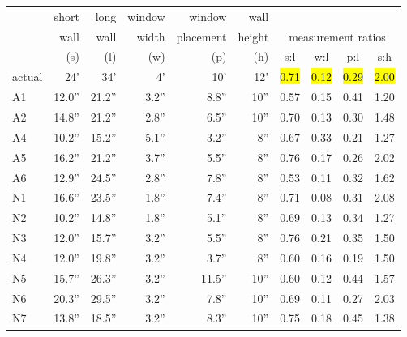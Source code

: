 \documentclass[review]{vgtc}                 %
\begin{document}
\begin{table}[b]
\vspace{-0.1in}
\begin{center}
\begin{small}
\begin{tabular}{@{}l@{~~}|@{~~}r@{~~~}r@{~~~}r@{~~~}r@{~~~}r@{~~}|@{~~}c@{~~~}c@{~~~}c@{~~~}c@{}} 
~       &  short   & long     & window  & window  &  wall      &  & & & \\
~       &  wall    & wall     & width   & placement &  height  &  \multicolumn{4}{c}{measurement ratios} \\ 
~       &  (s)     &  (l)     & (w)     & (p)     &  (h)  &  s:l  &  w:l  &  p:l & s:h \\ \hline
actual  &  24'     &  34'     &  4'     &  10'    &   12'   &\hl{0.71} &\hl{0.12} &\hl{0.29} &\hl{2.00} \\ 
\hline
A1      &  12.0''  &  21.2''  &  3.2''  &  8.8''  &   10''  &  0.57    &  0.15    &  0.41  &  1.20 \\ 
A2      &  14.8''  &  21.2''  &  2.8''  &  6.5''  &   10''  &  0.70    &  0.13    &  0.30  &  1.48 \\ 
A4      &  10.2''  &  15.2''  &  5.1''  &  3.2''  &    8''  &  0.67    &  0.33    &  0.21  &  1.27 \\ 
A5      &  16.2''  &  21.2''  &  3.7''  &  5.5''  &    8''  &  0.76    &  0.17    &  0.26  &  2.02 \\ 
A6      &  12.9''  &  24.5''  &  2.8''  &  7.8''  &    8''  &  0.53    &  0.11    &  0.32  &  1.62 \\ 
N1      &  16.6''  &  23.5''  &  1.8''  &  7.4''  &    8''  &  0.71    &  0.08    &  0.31  &  2.08 \\ 
N2      &  10.2''  &  14.8''  &  1.8''  &  5.1''  &    8''  &  0.69    &  0.13    &  0.34  &  1.27 \\ 
N3      &  12.0''  &  15.7''  &  3.2''  &  5.5''  &    8''  &  0.76    &  0.21    &  0.35  &  1.50 \\ 
N4      &  12.0''  &  19.8''  &  3.2''  &  3.7''  &    8''  &  0.60    &  0.16    &  0.19  &  1.50 \\ 
N5      &  15.7''  &  26.3''  &  3.2''  & 11.5''  &   10''  &  0.60    &  0.12    &  0.44  &  1.57 \\ 
N6      &  20.3''  &  29.5''  &  3.2''  &  7.8''  &   10''  &  0.69    &  0.11    &  0.27  &  2.03 \\ 
N7      &  13.8''  &  18.5''  &  3.2''  &  8.3''  &   10''  &  0.75    &  0.18    &  0.45  &  1.38 \\ \hline  

\end{tabular}
\end{small}
\end{center}
\end{table}
\end{document}
